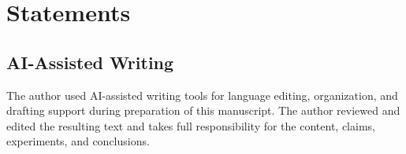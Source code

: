 \section*{Statements}
\subsection*{AI-Assisted Writing}
The author used AI-assisted writing tools for language editing, organization, and
drafting support during preparation of this manuscript. The author reviewed and
edited the resulting text and takes full responsibility for the content, claims,
experiments, and conclusions.

